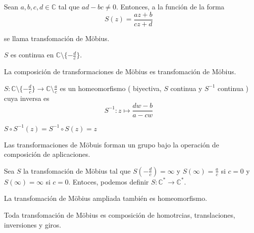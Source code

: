 \begin{defn}
  Sean $a, b, c, d \in \mathbb{C}$ tal que $ ad - b c \neq 0$. Entonces, a la función de la forma 
  \[ 
    S(z) = \frac{az +b}{cz + d}
  \]

  se llama transfomación de Möbius.
\end{defn}

\begin{obs}
  $S$ es continua en $\mathbb{C} \setminus \{ -\frac{d}{c} \}$.
\end{obs}

\begin{prop}
  La composición de transformaciones de Möbius es transfomación de Möbius.
\end{prop}

\begin{prop}
  $S:\mathbb{C} \setminus \{ -\frac{d}{c} \} \to \mathbb{C} \setminus \frac{a}{c}$ es un homeomorfismo ( biyectiva, $S$ continua y $S^{-1}$ continua ) cuya inversa es
  \[ 
    S^{-1}: z \mapsto \frac{dw - b}{a - cw} 
  \] 
  
\end{prop}

\begin{obs}
  $S \circ S^{-1}(z) = S^{-1} \circ S (z) = z$
\end{obs}

\begin{obs}
  Las transformaciones de Möbuis forman un grupo bajo la operación de composición de aplicaciones.
\end{obs}

\begin{defn}
  Sea $S$ la transfomación de Möbius tal que $S(-\frac{d}{c}) = \infty$ y $S(\infty) = \frac{a}{c}$ si $c=0$ y $S(\infty) = \infty$ si $c=0$. Entoces, podemos definir $S: \mathbb{C}^{*} \to \mathbb{C}^*$.
\end{defn}

\begin{obs}
  La transfomación de Möbius ampliada también es homeomorfismo.
\end{obs}

\begin{theo}
  Toda transfomación de Möbius es composición de homotrcias, translaciones, inversiones y giros.
\end{theo}
